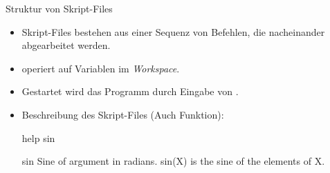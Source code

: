 \documentclass[hyperref={xetex}]{beamer}
\begin{document}


\begin{frame}[fragile]{Struktur von Skript-Files}
\begin{itemize}
\item Skript-Files bestehen aus einer Sequenz von Befehlen, die
  nacheinander abgearbeitet werden. 

\item operiert auf Variablen im \textit{Workspace}.

\item Gestartet wird das Programm  durch Eingabe von
  .

\item Beschreibung des Skript-Files (Auch Funktion):
\begin{matlabin}
help sin
\end{matlabin}
\begin{matlab}
   sin    Sine of argument in radians.
      sin(X) is the sine of the elements of X.
\end{matlab}


\end{itemize}
\end{frame}
\end{document}
